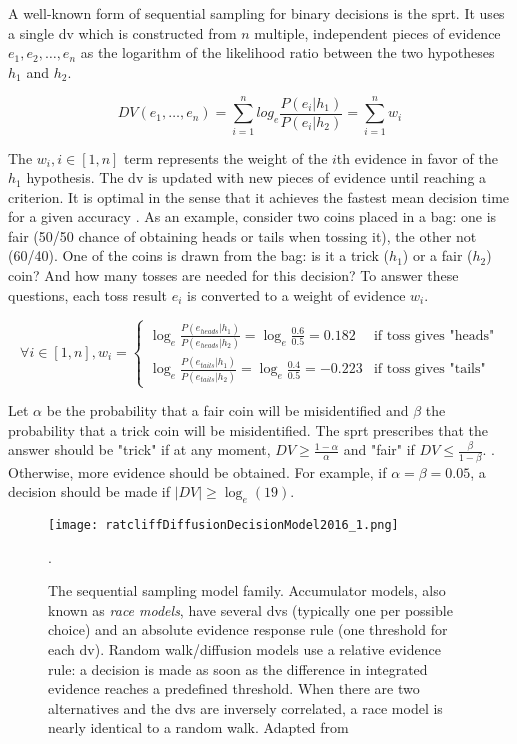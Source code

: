 A well-known form of sequential sampling for binary decisions is the \acrfull{sprt}. It uses a single \acrlong{dv} which is constructed from $n$ multiple, independent pieces of evidence $e_1, e_2, \dots, e_n$ as the logarithm of the likelihood ratio between the two hypotheses $h_1$ and $h_2$.

$$DV(e_1, \dots, e_n) = \sum_{i=1}^n log_e \frac{P(e_i|h_1)}{P(e_i|h_2)} = \sum_{i=1}^n w_i$$

The $w_i, i \in [1,n]$ term represents the weight of the $i$th evidence in favor of the $h_1$ hypothesis. The \Acrshort{dv} is updated with new pieces of evidence until reaching a criterion. It is optimal in the sense that it achieves the fastest mean decision time for a given accuracy \cite{bogaczOptimalDecisionmakingTheories2007}. As an example, consider two coins placed in a bag: one is fair (50/50 chance of obtaining heads or tails when tossing it), the other not (60/40). One of the coins is drawn from the bag: is it a trick ($h_1$) or a fair ($h_2$) coin? And how many tosses are needed for this decision? To answer these questions, each toss result $e_i$ is converted to a weight of evidence $w_i$.

$$\forall i \in[1,n], w_i=
    \begin{cases}
        \log_e \frac{P(e_{heads}|h_1)}{P(e_{heads}|h_2)} = \log_e \frac{0.6}{0.5} = 0.182  & \text{if toss gives "heads"} \\
        \log_e \frac{P(e_{tails}|h_1)}{P(e_{tails}|h_2)} = \log_e \frac{0.4}{0.5} = -0.223 & \text{if toss gives "tails"}
    \end{cases}$$

Let $\alpha$ be the probability that a fair coin will be misidentified and $\beta$ the probability that a trick coin will be misidentified. The \acrshort{sprt} prescribes that the answer should be "trick" if at any moment, $DV \ge \frac{1-\alpha}{\alpha}$ and "fair" if $DV \le \frac{\beta}{1-\beta}$. . Otherwise, more evidence should be obtained. For example, if $\alpha = \beta = 0.05$, a decision should be made if $|DV| \ge \log_e(19)$.

\begin{figure}[ht]
    \centering
    \texttt{[image: ratcliffDiffusionDecisionModel2016\_1.png]}
    \caption[The sequential sampling model family]{The sequential sampling model family. Accumulator models, also known as \textit{race models}, have several \acrlong{dv}s (typically one per possible choice) and an absolute evidence response rule (one threshold for each \acrshort{dv}). Random walk/diffusion models use a relative evidence rule: a decision is made as soon as the difference in integrated evidence reaches a predefined threshold. When there are two alternatives and the \acrshort{dv}s are inversely correlated, a race model is nearly identical to a random walk. Adapted from \cite{ratcliffDiffusionDecisionModel2016}}.
    \label{figure:sequential_sampling}
\end{figure}

